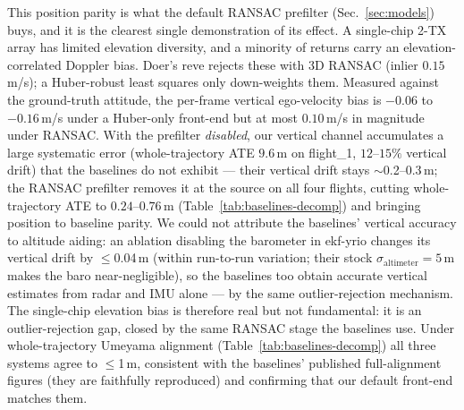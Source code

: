 \documentclass[journal]{IEEEtran}
\begin{document}
This position parity is what the default RANSAC prefilter
(Sec.~\ref{sec:models}) buys, and it is the clearest single
demonstration of its effect.  A single-chip 2-TX array has limited
elevation diversity, and a minority of returns carry an
elevation-correlated Doppler bias.  Doer's \mbox{reve} rejects these
with 3D RANSAC (inlier $0.15$\,m/s); a Huber-robust least squares only
down-weights them.  Measured against the ground-truth attitude, the
per-frame vertical ego-velocity bias is $-0.06$ to $-0.16$\,m/s under a
Huber-only front-end but at most $0.10$\,m/s in magnitude under RANSAC.
With the prefilter \emph{disabled}, our vertical channel accumulates a
large systematic error (whole-trajectory ATE $9.6$\,m on flight\_1,
$12$--$15\%$ vertical drift) that the baselines do not exhibit --- their
vertical drift stays $\sim$0.2--0.3\,m; the RANSAC prefilter removes it
at the source on all four flights, cutting whole-trajectory ATE to
$0.24$--$0.76$\,m (Table~\ref{tab:baselines-decomp}) and bringing
position to baseline parity.  We could not attribute the baselines'
vertical accuracy to altitude aiding: an ablation disabling the
barometer in ekf-yrio changes its vertical drift by $\le$0.04\,m (within
run-to-run variation; their stock $\sigma_\mathrm{altimeter}{=}5$\,m
makes the baro near-negligible), so the baselines too obtain accurate
vertical estimates from radar and IMU alone --- by the same
outlier-rejection mechanism.  The single-chip elevation bias is
therefore real but not fundamental: it is an outlier-rejection gap,
closed by the same RANSAC stage the baselines use.  Under
whole-trajectory Umeyama alignment (Table~\ref{tab:baselines-decomp})
all three systems agree to $\le$1\,m, consistent with the baselines'
published full-alignment figures (they are faithfully reproduced) and
confirming that our default front-end matches them.
\end{document}
